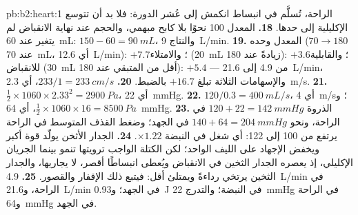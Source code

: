 \begin{solution}{pb:b2:heart:1}
الراحة، تُسلَّم في انبساط انكمش إلى عُشر الدورة:
فلا بد أن تتوسع  الإكليلية إلى حدها.
\textbf{18.} المعدل 100 نحوًا بلا كابح مبهمي، والحجم عند نهاية
الانقباض لم يتغير عند \qty{60}{mL}:  $150 - 60 = \qty{90}{mL}$،
والنتاج \qty{9}{L/min}.
\textbf{19.} المعدل وحده ($70 \to 180$ عند \qty{70}{mL}، أي
\qty{12.6}{L/min}): $+7.7$؛ والامتلاء (\qty{20}{mL} زيادةً عند 180):
$+3.6$؛ والقابلية للانقباض (\qty{30}{mL} أقل من المتبقي عند 180): $+5.4$ ---
من 4.9 إلى \qty{21.6}{L/min}، والإسهامات الثلاثة تبلغ
$+16.7$ بالضبط.
\textbf{20.} $233/1 = \qty{233}{cm/s}$، أي \qty{2.3}{m/s}.
\textbf{21.} $\tfrac12\times 1060\times 2.33^{2} = \qty{2900}{Pa}$، أي
\qty{22}{mmHg}.
\textbf{22.} $120/0.3 = \qty{400}{mL/s}$، أي \qty{4}{m/s}؛ و$\tfrac12\times
1060\times 16 = \qty{8500}{Pa}$، أي \qty{64}{mmHg}.
\textbf{23.} الذروة $120 + 22 = \qty{142}{mmHg}$ في الراحة، ونحو $140 +
64 = \qty{204}{mmHg}$ في الجهد؛ وضغط القذف المتوسط في
الراحة يرتفع من 100 إلى 122: أي شغل في النبضة $\times 1.22$.
\textbf{24.} الجدار الأثخن يولّد قوة أكبر ويخفض
الإجهاد على الليف الواحد؛ لكن الكتلة الواجب ترويتها تنمو بينما
الجريان الإكليلي، إذ يعصره الجدار الثخين في الانقباض ويُعطى
انبساطًا أقصر، لا يجاريها، والجدار الثخين يرتخي
رداءةً ويمتلئ أقل: فيتبع ذلك الإقفار والقصور.
\textbf{25.} \qty{4.9}{L/min} في الراحة، و\qty{21.6}{L/min} في الجهد؛
و\qty{0.93}{J} في النبضة؛ والتدرج \qty{22}{mmHg} في الراحة
و\qty{64}{mmHg} في الجهد.
\end{solution}
